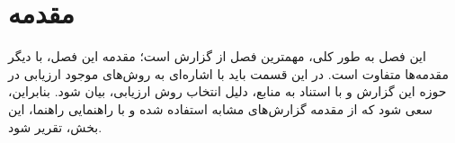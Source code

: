 \setcounter{secnumdepth}{0}
\section{مقدمه}
\label{ch5.0}
\setcounter{secnumdepth}{1}

این فصل به طور کلی، مهمترین فصل از گزارش است؛ مقدمه این فصل، با دیگر مقدمه‌ها متفاوت است. در این قسمت باید با اشاره‌ای به روش‌های موجود ارزیابی در حوزه این گزارش و با استناد به منابع، دلیل انتخاب روش ارزیابی، بیان شود. بنابراین، سعی شود که از مقدمه گزارش‌های مشابه استفاده شده و با راهنمایی راهنما، این بخش، تقریر شود.

